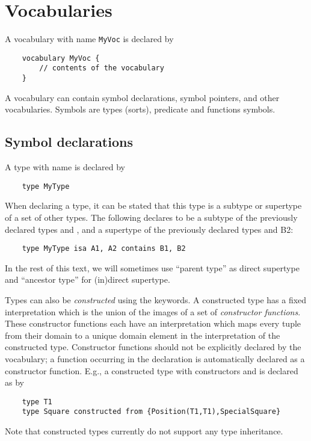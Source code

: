 \section{Vocabularies}
A vocabulary with name {\tt MyVoc} is declared by
\begin{lstlisting}
	vocabulary MyVoc {
		// contents of the vocabulary
	}
\end{lstlisting}
A vocabulary can contain symbol declarations, symbol pointers, and other vocabularies. Symbols are types (sorts), predicate and functions symbols.


\subsection{Symbol declarations}
\label{ssec:symbols}
A type with name  is declared by
\begin{lstlisting}
	type MyType
\end{lstlisting}
When declaring a type, it can be stated that this type is a subtype or supertype of a set of other types.  The following declares  to be a subtype of the previously declared types  and , and a supertype of the previously declared types  and {B2}:
\begin{lstlisting}
	type MyType isa A1, A2 contains B1, B2
\end{lstlisting}
In the rest of this text, we will sometimes use ``parent type'' as direct supertype and ``ancestor type'' for (in)direct supertype.

Types can also be \emph{constructed} using the  keywords. A constructed type has a fixed interpretation which is the union of the images of a set of \emph{constructor functions}. These constructor functions each have an interpretation which maps every tuple from their domain to a unique domain element in the interpretation of the constructed type. Constructor functions should not be explicitly declared by the vocabulary; a function occurring in the declaration is automatically declared as a constructor function. E.g., a constructed type  with constructors  and  is declared as by
\begin{lstlisting}
	type T1
	type Square constructed from {Position(T1,T1),SpecialSquare}
\end{lstlisting}
Note that constructed types currently do not support any type inheritance.\\

